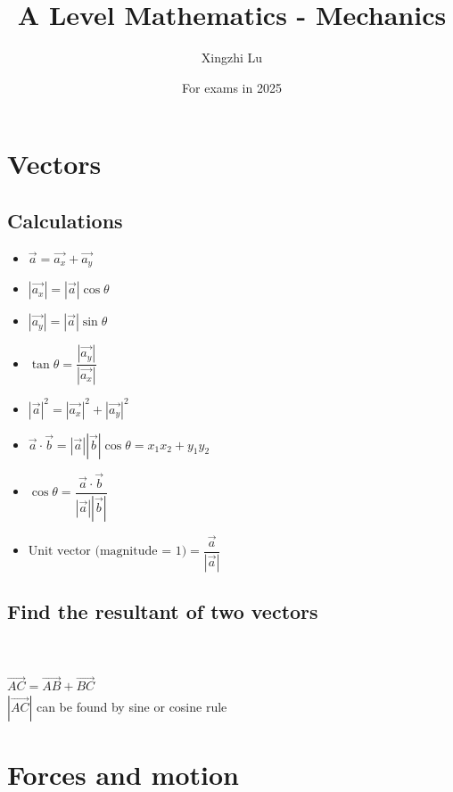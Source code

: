\documentclass[A4paper, 11pt]{article}
\title{A Level Mathematics - Mechanics}
\author{Xingzhi Lu}
\date{For exams in 2025}
\begin{document}
	\maketitle

	\section{Vectors}
	\subsection{Calculations}
	\begin{itemize}
		\item $\vec{a}=\vec{a_x}+\vec{a_y}$
		\item $|\vec{a_x}|=|\vec{a}|\cos\theta$
		\item $|\vec{a_y}|=|\vec{a}|\sin\theta$
		\item $\tan\theta = \dfrac{|\vec{a_y}|}{|\vec{a_x}|}$
		\item $|\vec{a}|^2=|\vec{a_x}|^2+|\vec{a_y}|^2$
		\item $\vec{a} \cdot \vec{b} = |\vec{a}||\vec{b}|\cos\theta = x_1x_2+y_1y_2$
		\item $\cos \theta = \dfrac{\vec{a} \cdot \vec{b}}{|\vec{a}||\vec{b}|}$
		\item $\text{Unit vector (magnitude = 1)} = \dfrac{\vec{a}}{|\vec{a}|}$

	\end{itemize}
	\subsection{Find the resultant of two vectors}
	\\
	\\
	$\overrightarrow{AC}=\overrightarrow{AB}+\overrightarrow{BC}$\\
	$|\overrightarrow{AC}|$ can be found by sine or cosine rule

	\section{Forces and motion}
	
\end{document}
